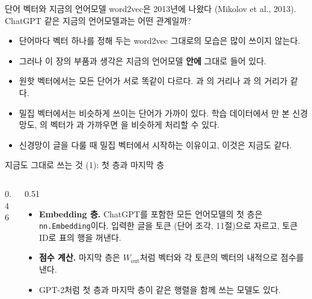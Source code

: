 \documentclass[aspectratio=169,11pt]{beamer}
\begin{document}
\begin{frame}{단어 벡터와 지금의 언어모델}
word2vec은 2013년에 나왔다 (Mikolov et al., 2013). ChatGPT 같은 지금의 언어모델과는 어떤 관계일까?
\begin{itemize}
\item 단어마다 벡터 하나를 정해 두는 word2vec 그대로의 모습은 많이 쓰이지 않는다.
\item 그러나 이 장의 부품과 생각은 지금의 언어모델 \textbf{안에} 그대로 들어 있다.
\end{itemize}
\vskip1mm
\begin{keybox}[왜 밀집 벡터인가]
\begin{itemize}
\item 원핫 벡터에서는 모든 단어가 서로 똑같이 다르다.
과 의 거리나 과 의 거리가 같다.
\item 밀집 벡터에서는 비슷하게 쓰이는 단어가 가까이 있다.
학습 데이터에서 만 본 신경망도, 의 벡터가 과 가까우면 을 비슷하게 처리할 수 있다.
\item 신경망이 글을 다룰 때 밀집 벡터에서 시작하는 이유이고, 이것은 지금도 같다.
\end{itemize}
\end{keybox}
\end{frame}

\begin{frame}{지금도 그대로 쓰는 것 (1): 첫 층과 마지막 층}
\begin{columns}[c,onlytextwidth]
\begin{column}{0.46\textwidth}
\end{column}
\begin{column}{0.51\textwidth}
\begin{itemize}
\item \textbf{Embedding 층.} ChatGPT를 포함한 모든 언어모델의 첫 층은 \texttt{nn.Embedding}이다.
입력한 글을 토큰 (단어 조각, 11절)으로 자르고, 토큰 ID로 표의 행을 꺼낸다.
\item \textbf{점수 계산.} 마지막 층은 $W_{\text{out}}$처럼 벡터와 각 토큰의 벡터의 내적으로 점수를 낸다.
\item GPT-2처럼 첫 층과 마지막 층이 같은 행렬을 함께 쓰는 모델도 있다.
\end{itemize}
\end{column}
\end{columns}
\end{frame}
\end{document}
